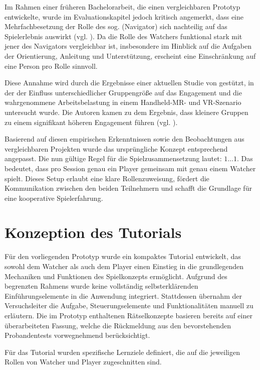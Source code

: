 Im Rahmen einer früheren Bachelorarbeit, die einen vergleichbaren Prototyp entwickelte, wurde im Evaluationskapitel jedoch kritisch angemerkt, dass eine Mehrfachbesetzung der Rolle des sog.  (Navigator) sich nachteilig auf das Spielerlebnis auswirkt (vgl. \citealp[S. 34]{lotz_konzeption_2021}). Da die Rolle des Watchers funktional stark mit jener des Navigators vergleichbar ist, insbesondere im Hinblick auf die Aufgaben der Orientierung, Anleitung und Unterstützung, erscheint eine Einschränkung auf eine Person pro Rolle sinnvoll.

Diese Annahme wird durch die Ergebnisse einer aktuellen Studie von \cite{bautista_isaza_understanding_2024} gestützt, in der der Einfluss unterschiedlicher Gruppengröße auf das Engagement und die wahrgenommene Arbeitsbelastung in einem Handheld-\ac{MR}- und \ac{VR}-Szenario untersucht wurde. Die Autoren kamen zu dem Ergebnis, dass kleinere Gruppen zu einem signifikant höheren Engagement führen (vgl. \citealp[S. 197:22]{bautista_isaza_understanding_2024}).

Basierend auf diesen empirischen Erkenntnissen sowie den Beobachtungen aus vergleichbaren Projekten wurde das ursprüngliche Konzept entsprechend angepasst. Die nun gültige Regel für die Spielzusammensetzung lautet: $1\ldots1$. Das bedeutet, dass pro Session genau ein Player gemeinsam mit genau einem Watcher spielt. Dieses Setup erlaubt eine klare Rollenzuweisung, fördert die Kommunikation zwischen den beiden Teilnehmern und schafft die Grundlage für eine kooperative Spielerfahrung.

\section{Konzeption des Tutorials}

Für den vorliegenden Prototyp wurde ein kompaktes Tutorial entwickelt, das sowohl dem Watcher als auch dem Player einen Einstieg in die grundlegenden Mechaniken und Funktionen des Spielkonzepts ermöglicht. Aufgrund des begrenzten Rahmens wurde keine vollständig selbsterklärenden Einführungselemente in die Anwendung integriert. Stattdessen übernahm der Versuchsleiter die Aufgabe, Steuerungselemente und Funktionalitäten manuell zu erläutern. Die im Prototyp enthaltenen Rätselkonzepte basieren bereits auf einer überarbeiteten Fassung, welche die Rückmeldung aus den bevorstehenden Probandentests vorwegnehmend berücksichtigt.

Für das Tutorial wurden spezifische Lernziele definiert, die auf die jeweiligen Rollen von Watcher und Player zugeschnitten sind.

